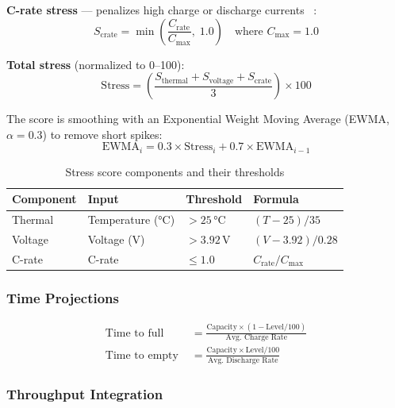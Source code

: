 \documentclass[12pt,a4paper]{report}
\begin{document}
\textbf{C-rate stress} — penalizes high charge or discharge currents \cite{LargeBattery}~:
\begin{equation}
  S_{\text{crate}} = \min\!\left(\frac{C_{\text{rate}}}{C_{\text{max}}},\; 1.0\right) \quad \text{where } C_{\text{max}} = 1.0
\end{equation}

\textbf{Total stress} (normalized to 0--100):
\begin{equation}
  \text{Stress} = \left(\frac{S_{\text{thermal}} + S_{\text{voltage}} + S_{\text{crate}}}{3}\right) \times 100
\end{equation}

The score is smoothing with an Exponential Weight Moving Average (EWMA,
$\alpha = 0.3$) to remove short spikes:
\begin{equation}
  \text{EWMA}_i = 0.3 \times \text{Stress}_i + 0.7 \times \text{EWMA}_{i-1}
\end{equation}

\begin{table}[H]
\caption{Stress score components and their thresholds}
\centering
\small
\begin{tabular}{llll}
\toprule
\textbf{Component} & \textbf{Input} & \textbf{Threshold} & \textbf{Formula}\\
\midrule
Thermal  & Temperature (°C) & $> 25$\,°C  & $(T-25) / 35$\\
Voltage  & Voltage (V) & $> 3.92$\,V & $(V-3.92) / 0.28$\\
C-rate   & C-rate & $\leq 1.0$  & $C_{\text{rate}} / C_{\text{max}}$\\
\bottomrule
\end{tabular}
\end{table}

\subsubsection{Time Projections}

\begin{align}
  \text{Time to full } &= \frac{\text{Capacity} \times (1 - \text{Level}/100)}
                                   {\text{Avg.\ Charge Rate}}\\[4pt]
  \text{Time to empty } &= \frac{\text{Capacity} \times \text{Level}/100}
                                    {\text{Avg.\ Discharge Rate}}
\end{align}

\subsubsection{Throughput Integration}
\end{document}
